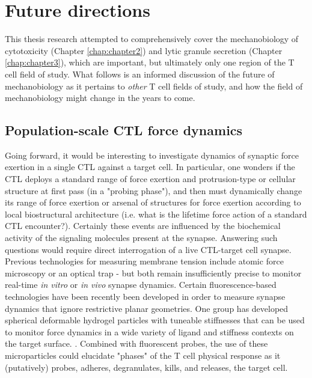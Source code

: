 \section{Future directions}

This thesis research attempted to comprehensively cover the mechanobiology of cytotoxicity (Chapter \ref{chap:chapter2}) and lytic granule secretion (Chapter \ref{chap:chapter3}), which are important, but ultimately only one region of the T cell field of study. What follows is an informed discussion of the future of mechanobiology as it pertains to \textit{other} T cell fields of study, and how the field of mechanobiology might change in the years to come.

\subsection{Population-scale CTL force dynamics}

Going forward, it would be interesting to investigate dynamics of synaptic force exertion in a single CTL against a target cell. In particular, one wonders if the CTL deploys a standard range of force exertion and protrusion-type or cellular structure at first pass (in a "probing phase"), and then must dynamically change its range of force exertion or arsenal of structures for force exertion according to local biostructural architecture (i.e. what is the lifetime force action of a standard CTL encounter?). Certainly these events are influenced by the biochemical activity of the signaling molecules present at the synapse. Answering such questions would require direct interrogation of a live CTL-target cell synapse. Previous technologies for measuring membrane tension include atomic force microscopy or an optical trap - but both remain insufficiently precise to monitor real-time \textit{in vitro} or \textit{in vivo} synapse dynamics. Certain fluorescence-based technologies have been recently been developed in order to measure synapse dynamics that ignore restrictive planar geometries. One group has developed spherical deformable hydrogel particles with tuneable stiffnesses that can be used to monitor force dynamics in a wide variety of ligand and stiffness contexts on the target surface. \cite{Vorselen2020}. Combined with fluorescent probes, the use of these microparticles could elucidate "phases" of the T cell physical response as it (putatively) probes, adheres, degranulates, kills, and releases, the target cell.

